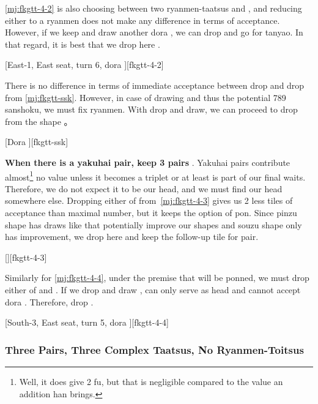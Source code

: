 \documentclass[12pt]{article}
\begin{document}
\ref{mj:fkgtt-4-2} is also choosing between two ryanmen-taatsus  and , and reducing either to a ryanmen does not make any difference in terms of acceptance. However, if we keep  and draw another dora , we can drop  and go for tanyao. In that regard, it is best that we drop  here \citep[][p.~24]{uzaku-nankiru}.

[East-1, East seat, turn 6, dora ][fkgtt-4-2]

There is no difference in terms of immediate acceptance between  drop and  drop from \ref{mj:fkgtt-ssk}. However, in case of drawing  and thus the potential 789 sanshoku, we must fix  ryanmen. With  drop and  draw, we can proceed to drop  from the shape  \citep{nemata-16}。

[Dora ][fkgtt-ssk]

\textbf{When there is a yakuhai pair, keep 3 pairs} \citep[][p.~72]{uzaku-haikouritsu}. Yakuhai pairs contribute almost\footnote{Well, it does give 2 fu, but that is negligible compared to the value an addition han brings.} no value unless it becomes a triplet or at least is part of our final waits. Therefore, we do not expect it to be our head, and we must find our head somewhere else. Dropping either of  from~\ref{mj:fkgtt-4-3} gives us 2 less tiles of acceptance than maximal number, but it keeps the option of  pon. Since pinzu shape has draws like  that potentially improve our shapes and souzu shape only has  improvement, we drop  here and keep the follow-up tile for  pair.

[][fkgtt-4-3]

Similarly for \ref{mj:fkgtt-4-4}, under the premise that  will be ponned, we must drop either of  and . If we drop  and draw ,  can only serve as head and cannot accept dora . Therefore, drop .

[South-3, East seat, turn 5, dora ][fkgtt-4-4]


\subsubsection*{Three Pairs, Three Complex Taatsus, No Ryanmen-Toitsus}
\end{document}
